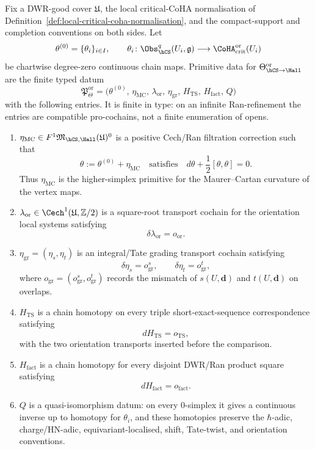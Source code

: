 \begin{definition}
\label{def:hcs-hall-primitive-witness-package}
Fix a DWR-good cover $\mathfrak U$, the local critical-CoHA
normalisation of Definition~\ref{def:local-critical-coha-normalisation},
and the compact-support and completion conventions on both sides. Let
\[
 \theta^{(0)}=\{\theta_i\}_{i\in I},
 \qquad
 \theta_i\colon
 \Obs_{\hCS}^{q}(U_i,\mathfrak g)
 \longrightarrow
 \CoHA_{\mathrm{crit}}^{\mathrm{or}}(U_i)
\]
be chartwise degree-zero continuous chain maps. Primitive data for
$\Theta_{\hCS\to\Hall}^{\mathrm{or}}$ are the finite typed datum
\[
 \mathfrak P_{\Theta}^{\mathrm{or}}
 =
 \bigl(
 \theta^{(0)},\,
 \eta_{\mathrm{MC}},\,
 \lambda_{\mathrm{or}},\,
 \eta_{\mathrm{gr}},\,
 H_{\mathrm{TS}},\,
 H_{\mathrm{fact}},\,
 Q
 \bigr)
\]
with the following entries. It is finite in type: on an infinite
Ran-refinement the entries are compatible pro-cochains, not a finite
enumeration of opens.
\begin{enumerate}
\item $\eta_{\mathrm{MC}}\in F^1
\mathfrak M_{\hCS,\Hall}(\mathfrak U)^0$ is a positive Cech/Ran
filtration correction such that
\[
 \theta:=\theta^{(0)}+\eta_{\mathrm{MC}}
 \quad\text{satisfies}\quad
 d\theta+\frac12[\theta,\theta]=0.
\]
Thus $\eta_{\mathrm{MC}}$ is the higher-simplex primitive for the
Maurer--Cartan curvature of the vertex maps.
\item $\lambda_{\mathrm{or}}\in
\Cech^1(\mathfrak U,\mathbb Z/2)$ is a square-root transport cochain for
the orientation local systems satisfying
\[
 \delta\lambda_{\mathrm{or}}=o_{\mathrm{or}}.
\]
\item $\eta_{\mathrm{gr}}=(\eta_s,\eta_t)$ is an integral/Tate grading
transport cochain satisfying
\[
 \delta\eta_s=o_{\mathrm{gr}}^{s},
 \qquad
 \delta\eta_t=o_{\mathrm{gr}}^{t},
\]
where $o_{\mathrm{gr}}=(o_{\mathrm{gr}}^s,o_{\mathrm{gr}}^t)$ records
the mismatch of $s(U,\mathbf d)$ and $t(U,\mathbf d)$ on overlaps.
\item $H_{\mathrm{TS}}$ is a chain homotopy on every triple
short-exact-sequence correspondence satisfying
\[
 dH_{\mathrm{TS}}=o_{\mathrm{TS}},
\]
with the two orientation transports inserted before the comparison.
\item $H_{\mathrm{fact}}$ is a chain homotopy for every disjoint
DWR/Ran product square satisfying
\[
 dH_{\mathrm{fact}}=o_{\mathrm{fact}}.
\]
\item $Q$ is a quasi-isomorphism datum: on every $0$-simplex it
gives a continuous inverse up to homotopy for $\theta_i$, and these
homotopies preserve the $\hbar$-adic, charge/HN-adic,
equivariant-localised, shift, Tate-twist, and orientation conventions.
\end{enumerate}
\end{definition}

